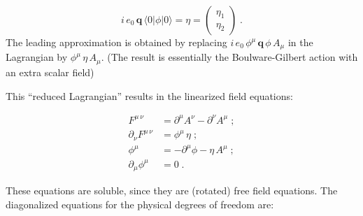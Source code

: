 \documentclass[12pt]{article}
\begin{document}
\begin{equation*}
  i\, e_0\, \mathbf{q}\, \langle 0| \phi | 0\rangle = \eta =
  \begin{pmatrix}
    \eta_1 \\
    \eta_2
  \end{pmatrix}\; .
\end{equation*}
The leading approximation is obtained by replacing $i\, e_0\, \phi^{\mu}\, \mathbf{q}\, \phi\, A_{\mu}$ in
the Lagrangian by $\phi^{\mu}\, \eta\, A_{\mu}$.
(The result is essentially the Boulware-Gilbert action \cite{bg;1962} with an extra scalar field)

This ``reduced Lagrangian'' results in the linearized field equations:

\begin{align*}
  F^{\mu\, \nu} &= \partial^{\mu} A^{\nu} - \partial^{\nu} A^{\mu} \; ;\\
  \partial_{\nu} F^{\mu\, \nu} &= \phi^{\mu}\, \eta\; ; \\
  \phi^{\mu} &= -\partial^{\mu}\phi - \eta\, A^{\mu} \; ; \\
  \partial_{\mu}\phi^{\mu} &= 0\; .
\end{align*}

These equations are soluble, since they are (rotated) free field
 equations. The diagonalized equations for the physical degrees of freedom
 are:
\end{document}
